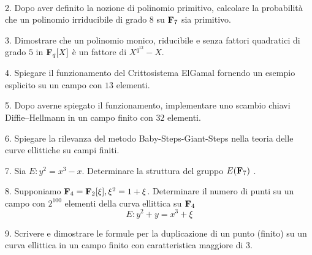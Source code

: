 \ \dotfill\ \bigskip\bigskip\bigskip


\vfil\eject


\item{2.} Dopo aver definito la nozione di polinomio primitivo, calcolare la probabilit\`a che un polinomio irriducibile di grado $8$ su ${\bf F}_7$ sia 
primitivo.\vv


\item{3.} Dimostrare che un polinomio monico, riducibile e senza fattori quadratici di grado $5$ in ${\bf F}_q[X]$ \`e un
fattore di $X^{q^{12}}-X$. \vv



\item{4.} Spiegare il funzionamento del Crittosistema ElGamal fornendo un esempio esplicito su un campo con $13$ elementi.
\ve\ \vs

\item{5.} Dopo averne spiegato il funzionamento, implementare uno scambio chiavi Diffie--Hellmann in un campo finito
con $32$ elementi.
\vv

\item{6.} Spiegare la rilevanza del metodo Baby-Steps-Giant-Steps nella teoria delle curve ellittiche su campi finiti.
\vv


\item{7.} Sia $E: y^2=x^3-x$. Determinare la struttura del gruppo $E({\bf F}_7)$ .
\ve\ \vs

\item{8.} Supponiamo ${\bf F}_4={\bf F}_2[\xi], \xi^2=1+\xi$. 
Determinare il numero di punti su un campo con $2^{100}$ elementi della curva ellittica su ${\bf F}_4$ 
$$E: y^2+y=x^3+\xi$$
\vv

%

\item{9.} Scrivere e dimostrare le formule per la duplicazione di un punto (finito) su un curva ellittica in un campo
finito con caratteristica maggiore di $3$.

\ \vst
 \bye

